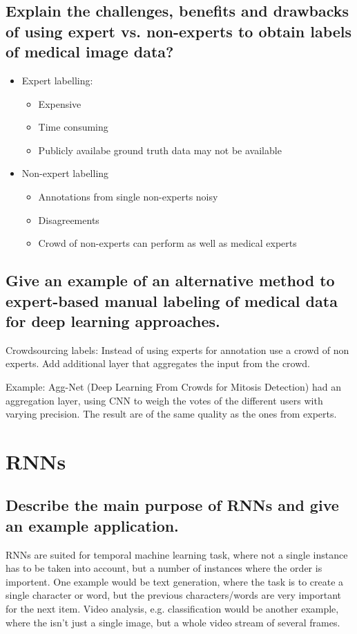\subsection{Explain the challenges, benefits and drawbacks of using expert vs. non-experts to obtain labels of medical image data?}
\begin{itemize}
\item Expert labelling:
\begin{itemize}
\item Expensive
\item Time consuming
\item Publicly availabe ground truth data may not be available
\end{itemize}
\item Non-expert labelling
\begin{itemize}
\item Annotations from single non-experts noisy
\item Disagreements
\item Crowd of non-experts can perform as well as medical experts
\end{itemize}
\end{itemize}
\subsection{Give  an example of an alternative method to expert-based manual labeling of medical data for deep learning approaches.}
Crowdsourcing labels: Instead of using experts for annotation use a crowd of non experts. Add additional layer that aggregates the input from the crowd.

Example: Agg-Net (Deep Learning From Crowds for Mitosis Detection) had an aggregation layer, using CNN to weigh the votes of the different users with varying precision. The result are of the same quality as the ones from experts.
%
\section{RNNs}
\subsection{Describe the main purpose of RNNs and give an example application.}
RNNs are suited for temporal machine learning task, where not a single instance has to be taken into account, but a number of instances where the order is importent. One example would be text generation, where the task is to create a single character or word, but the previous characters/words are very important for the next item. Video analysis, e.g. classification would be another example, where the isn't just a single image, but a whole video stream of several frames.
